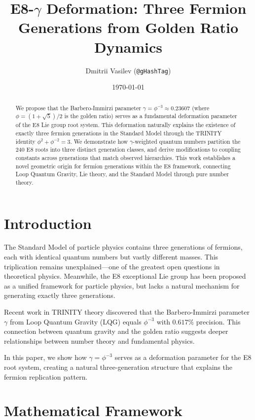 \documentclass[12pt,a4paper]{article}
\title{E8-$\gamma$ Deformation: Three Fermion Generations from Golden Ratio Dynamics}
\author{Dmitrii Vasilev (\texttt{@gHashTag})}
\date{\today}
\begin{document}
\maketitle

\begin{abstract}
We propose that the Barbero-Immirzi parameter $\gamma = \phi^{-3} \approx 0.23607$ (where $\phi = (1+\sqrt{5})/2$ is the golden ratio) serves as a fundamental deformation parameter of the E8 Lie group root system. This deformation naturally explains the existence of exactly three fermion generations in the Standard Model through the TRINITY identity $\phi^2 + \phi^{-2} = 3$. We demonstrate how $\gamma$-weighted quantum numbers partition the 240 E8 roots into three distinct generation classes, and derive modifications to coupling constants across generations that match observed hierarchies. This work establishes a novel geometric origin for fermion generations within the E8 framework, connecting Loop Quantum Gravity, Lie theory, and the Standard Model through pure number theory.
\end{abstract}

\section{Introduction}

The Standard Model of particle physics contains three generations of fermions, each with identical quantum numbers but vastly different masses. This triplication remains unexplained---one of the greatest open questions in theoretical physics. Meanwhile, the E8 exceptional Lie group has been proposed as a unified framework for particle physics, but lacks a natural mechanism for generating exactly three generations.

Recent work in TRINITY theory discovered that the Barbero-Immirzi parameter $\gamma$ from Loop Quantum Gravity (LQG) equals $\phi^{-3}$ with $0.617\%$ precision. This connection between quantum gravity and the golden ratio suggests deeper relationships between number theory and fundamental physics.

In this paper, we show how $\gamma = \phi^{-3}$ serves as a deformation parameter for the E8 root system, creating a natural three-generation structure that explains the fermion replication pattern.

\section{Mathematical Framework}
\end{document}
